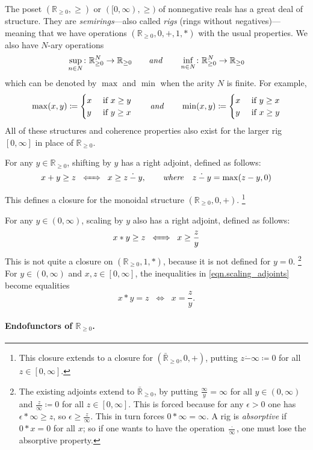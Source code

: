 \documentclass[11pt, one side, article]{memoir}
\theoremstyle{definition}
\theoremstyle{plain}
\newcommand{\tn}[1]{\textnormal{#1}}
\newcommand{\rr}{\mathbb{R}}
\newcommand{\blank}[1][1pt]{\hspace{#1}\cdot\hspace{#1}}
\newcommand{\hh}[2][]{#1 \tn{\textit{#2}} #1}
\newcommand{\qqand}{\hh[\qquad]{and}}
\renewcommand{\iff}[1][\;\;]{#1\Leftrightarrow#1}
\newcommand{\ifff}[1][\;\;]{#1\xLeftrightarrow{\quad}#1}
\newcommand{\hi}[4][]{#1 #2 \tn{\textit{#4}} #3}
\newcommand{\where}[1][,]{\hi[#1]{\qquad}{\quad}{where}}
\newcommand{\rrnon}{\rr_{\geq0}}
\newcommand{\rrnonbar}{\bar{\rr}_{\geq0}}
\newcommand{\dotminus}{\mathbin{\dot{-}}}
\begin{document}
The poset $(\rrnon,\geq)$ or $([0,\infty),\geq)$ of nonnegative reals has a great deal of structure. They are \emph{semirings}---also called \emph{rigs} (rings without \emph{n}egatives)---meaning that we have operations $(\rrnon,0,+,1,*)$ with the usual properties. We also have $N$-ary operations
\[
	\sup_{n\in N}\colon\rrnon^N\to\rrnon
	\qqand
	\inf_{n\in N}\colon\rrnon^N\to\rrnon	
\]
which can be denoted by $\max$ and $\min$ when the arity $N$ is finite. For example,
\[
\max(x,y)\coloneqq
\begin{cases}
	x&\tn{ if }x\geq y\\
	y&\tn{ if }y\geq x
\end{cases}
\qqand
\min(x,y)\coloneqq
\begin{cases}
	x&\tn{ if }y\geq x\\
	y&\tn{ if }x\geq y
\end{cases}
\]
All of these structures and coherence properties also exist for the larger rig $[0,\infty]$ in place of $\rrnon$.

For any $y\in\rrnon$, shifting by $y$ has a right adjoint, defined as follows:
\[
x+y\geq z\ifff x\geq z\dotminus y
\where
z\dotminus y=\max(z-y,0)
\]
This defines a closure for the monoidal structure $(\rrnon,0,+)$.%
\footnote{This closure extends to a closure for $(\rrnonbar,0,+)$, putting $z\dotminus\infty\coloneqq 0$ for all $z\in[0,\infty]$.}

For any $y\in(0,\infty)$, scaling by $y$ also has a right adjoint, defined as follows:
\begin{equation}\label{eqn.scaling_adjoints}
x*y\geq z\ifff x\geq \frac{z}{y}
\end{equation}
This is not quite a closure on $(\rrnon,1,*)$, because it is not defined for $y=0$.%
\footnote{The existing adjoints extend to $\rrnonbar$, by putting $\frac{\infty}{y}=\infty$ for all $y\in(0,\infty)$ and $\frac{z}{\infty}\coloneqq 0$ for all $z\in[0,\infty]$. This is forced because for any $\epsilon>0$ one has $\epsilon*\infty\geq z$, so $\epsilon\geq\frac{z}{\infty}$. This in turn forces $0*\infty=\infty$. A rig is \emph{absorptive} if $0*x=0$ for all $x$; so if one wants to have the operation $\frac{\blank}{\infty}$, one must lose the absorptive property.}
For $y\in(0,\infty)$ and $x,z\in[0,\infty]$, the inequalities in \eqref{eqn.scaling_adjoints} become equalities
\[x*y = z\iff x = \frac{z}{y}.\]

\paragraph{Endofunctors of $\rrnon$.}
\end{document}
